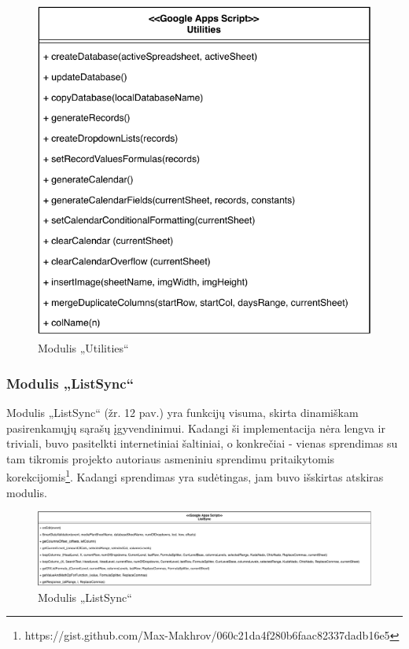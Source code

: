 \begin{figure}[H]
    \centering
    \includegraphics[scale=0.6]{Images/module-utilities.pdf}
    \caption{Modulis „Utilities“}
    \label{img:model}
\end{figure}

\subsubsection{Modulis „ListSync“}
Modulis „ListSync“ (žr. 12 pav.) yra funkcijų visuma, skirta dinamiškam pasirenkamųjų sąrašų įgyvendinimui. Kadangi ši implementacija nėra lengva ir triviali, buvo pasitelkti internetiniai šaltiniai, o konkrečiai - vienas sprendimas su tam tikromis projekto autoriaus asmeniniu sprendimu pritaikytomis korekcijomis\footnote{https://gist.github.com/Max-Makhrov/060c21da4f280b6faac82337dadb16e5}. Kadangi sprendimas yra sudėtingas, jam buvo išskirtas atskiras modulis.

\begin{figure}[H]
    \centering
    \includegraphics[scale=0.5]{Images/module-list-sync.pdf}
    \caption{Modulis „ListSync“}
    \label{img:model}
\end{figure}

